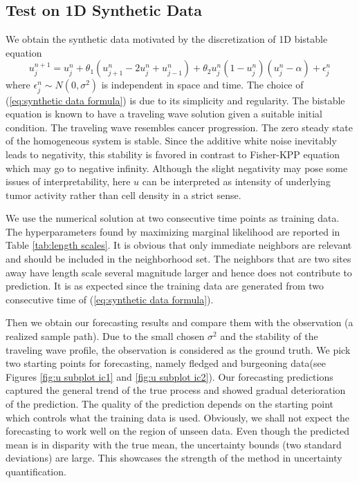 \documentclass[smallextended,natbib]{svjour3}       %
\begin{document}
\subsection{Test on 1D Synthetic Data}
\label{sec:GP1d}
We obtain the synthetic data motivated by the discretization of 1D bistable equation
\begin{equation}
u_{j}^{n+1}=u_{j}^{n}+\theta_{1}(u_{j+1}^{n}-2u_{j}^{n}+u_{j-1}^{n})+\theta_{2}u_{j}^{n}(1-u_{j}^{n})(u_{j}^{n}-\alpha)+\epsilon_{j}^{n}\label{eq:synthetic data formula}
\end{equation}
where $\epsilon_{j}^{n}\sim N(0,\sigma^{2})$ is independent in space and time. The choice of (\ref{eq:synthetic data formula}) is due to its simplicity and regularity. The bistable equation is known to have a traveling wave solution given a suitable initial condition. The traveling wave resembles cancer progression. The zero steady state of the homogeneous system is stable. Since the additive white noise inevitably leads to negativity, this stability is favored in contrast to Fisher-KPP equation which may go to negative infinity. Although the slight negativity may pose some issues of interpretability, here $u$ can be interpreted as intensity of underlying tumor activity rather than cell density in a strict sense.           

We use the numerical solution at two consecutive time points as training data. The hyperparameters found by maximizing marginal likelihood are reported in Table \ref{tab:length scales}. It is obvious that only immediate neighbors are relevant and should be included in the neighborhood set. The neighbors that are two sites away have length scale several magnitude larger and hence does not contribute to prediction. It is as expected since the training data are generated from two consecutive time of (\ref{eq:synthetic data formula}).     

Then we obtain our forecasting results and compare them with the observation (a realized sample path). Due to the small chosen $\sigma^2$ and the stability of the traveling wave profile, the observation is considered as the ground truth.  We pick two starting points for forecasting, namely fledged and burgeoning data(see Figures \ref{fig:u subplot ic1} and \ref{fig:u subplot ic2}). Our forecasting predictions captured the general trend of the true process and showed gradual deterioration of the prediction. The quality of the prediction depends on the starting point which controls what the training data is used. Obviously, we shall not expect the forecasting to work well on the region of unseen data. Even though the predicted mean is in disparity with the true mean, the uncertainty bounds (two standard deviations) are large. This showcases the strength of the method in uncertainty quantification. 
\end{document}
